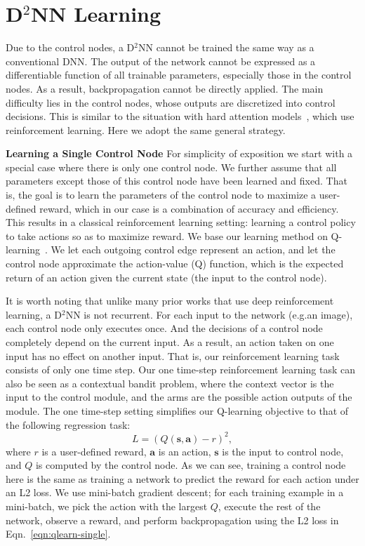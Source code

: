 \documentclass[10pt,twocolumn,letterpaper]{article}
\newcommand{\smallparagraph}[1]{\smallskip \noindent \textbf{#1}}
\begin{document}
\section{D$^2$NN Learning} 

Due to the control nodes, a D$^2$NN cannot be trained the same way as a conventional
DNN. The output of the network cannot be expressed as a differentiable
function of all trainable parameters, especially those in the control nodes. As a
result, backpropagation cannot be directly applied.
The main difficulty lies in the control nodes, whose outputs are discretized into control
decisions. This is similar to the situation with hard attention models~\cite{mnih2014recurrent,ba2014multiple},
which use reinforcement learning. Here we adopt the same general strategy. 

\smallparagraph{Learning a Single Control Node} 
 For simplicity of exposition we start with a special case where there is only
one control node. We further assume that all parameters except those of this control node
have been learned and fixed. That is, the goal is to learn the parameters of the control
node to maximize a user-defined reward, which in our case is a combination of accuracy and
efficiency. This results in a classical reinforcement learning
setting: learning a control policy to take actions so as to maximize reward. 
We base our learning method on Q-learning~\cite{mnih2013playing,sutton1998reinforcement}. 
We let each outgoing control edge represent an action, and let the control node approximate
the action-value (Q) function, which is the expected return of an action given the current
state (the input to the control node).

It is worth noting that unlike many prior works that use deep reinforcement learning,
 a D$^2$NN is not recurrent. For each input to the network (e.g.\@ an image),
each control node only executes once. And the decisions of a control node
completely depend on the current input. As a result, an action taken on one input has no
effect on another input. That is, our reinforcement learning task consists of only one time step. 
Our one time-step reinforcement learning task can also be seen as a contextual bandit problem, where the context vector is the input to the control module, and the arms are the possible action outputs of the module.
The one time-step setting simplifies our Q-learning
objective to that of the following regression task: 
\begin{equation} 
L= (Q(\boldsymbol{s},\boldsymbol{a}) - r)^2, 
\label{eqn:qlearn-single}
\end{equation}
where $r$ is a user-defined reward, $\boldsymbol{a}$ is an action, $\boldsymbol{s}$ is
the input to control node, and $Q$ is computed by the control node.
As we can see, training a control node here is the same as training a
network to predict the reward for each action under an L2 loss. We use
mini-batch gradient descent; for each training example
in a mini-batch, we pick the action with the largest $Q$, execute the rest of the
network, observe a reward, and perform backpropagation using the L2 loss in Eqn.~\ref{eqn:qlearn-single}.
\end{document}
